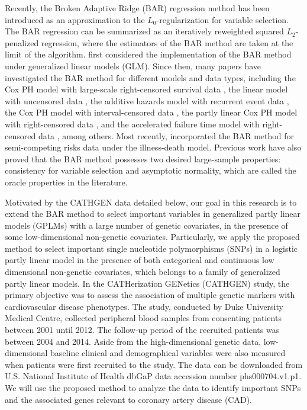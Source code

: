 \documentclass[11pt]{article}
\begin{document}
Recently, the Broken Adaptive Ridge (BAR) regression method has been introduced as an approximation to the $L_0$-regularization for variable selection. The BAR regression can be summarized as an iteratively reweighted squared $L_2$-penalized regression, where the estimators of the BAR method are taken at the limit of the algorithm. \cite{liu2016efficient} first considered the implementation of the BAR method under generalized linear models (GLM). Since then, many papers have investigated the BAR method for different models and data types, including the Cox PH model with large-scale right-censored survival data \citep{kawaguchi2020surrogate}, the linear model with uncensored data \citep{dai2018broken}, the additive hazards model with recurrent event data \citep{zhao2018variable}, the Cox PH model with interval-censored data \citep{zhao2019simultaneous}, the partly linear Cox PH model with right-censored data \citep{wu2020variable}, and the accelerated failure time model with right-censored data \citep{sun2022broken}, among others. Most recently, \cite{mahmoudi2022penalized} incorporated the BAR method for semi-competing risks data under the illness-death model. Previous work \citep{dai2018broken,zhao2018variable,kawaguchi2020surrogate} have also proved that the BAR method possesses two desired large-sample properties: consistency for variable selection and asymptotic normality, which are called the oracle properties in the literature. 

Motivated by the CATHGEN data detailed below, our goal in this research is to extend the BAR method to select important variables in generalized partly linear models (GPLMs) with a large number of genetic covariates, in the presence of some low-dimensional non-genetic covariates. Particularly, we apply the proposed method to select important single nucleotide polymorphisms (SNPs) in a logistic partly linear model in the presence of both categorical and continuous low dimensional non-genetic covariates, which belongs to a family of generalized partly linear models. In the CATHerization GENetics (CATHGEN) study, the primary objective was to assess the association of multiple genetic markers with cardiovascular disease phenotypes. The study, conducted by Duke University Medical Centre, collected peripheral blood samples from consenting patients between 2001 until 2012. The follow-up period of the recruited patients was between 2004 and 2014. Aside from the high-dimensional genetic data, low-dimensional baseline clinical and demographical variables were also measured when patients were first recruited to the study. The data can be downloaded from U.S. National Institute of Health dbGaP data accession number phs000704.v1.p1. We will use the proposed method to analyze the data to identify important SNPs and the associated genes relevant to coronary artery disease (CAD). 
\end{document}
